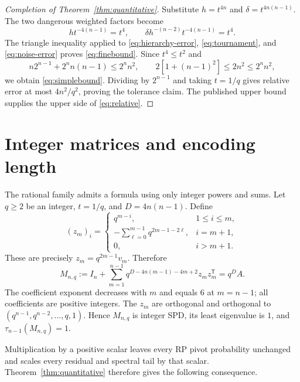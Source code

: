 \documentclass[10pt,letterpaper]{article}
\begin{document}
\begin{proof}[Completion of Theorem~\ref{thm:quantitative}]
Substitute $h=t^{4n}$ and $\delta=t^{4n(n-1)}$. The two dangerous
weighted factors become
\begin{equation}\label{eq:exponents}
 h t^{-4(n-1)}=t^4,\qquad
 \delta h^{-(n-2)}t^{-4(n-1)}=t^4.
\end{equation}
The triangle inequality applied to \eqref{eq:hierarchy-error},
\eqref{eq:tournament}, and \eqref{eq:noise-error} proves
\eqref{eq:finebound}. Since $t^4\leq t^2$ and
\[
 n2^{n-1}+2^n n(n-1)\leq2^n n^2,
 \qquad 2[1+(n-1)^2]\leq2n^2\leq2^n n^2,
\]
we obtain \eqref{eq:simplebound}. Dividing by $2^{n-1}$ and taking
$t=1/q$ gives relative error at most $4n^2/q^2$, proving the tolerance
claim. The published upper bound supplies the upper side of
\eqref{eq:relative}.
\end{proof}

\section{Integer matrices and encoding length}\label{sec:integer}

The rational family admits a formula using only integer powers and sums.
Let $q\geq2$ be an integer, $t=1/q$, and $D=4n(n-1)$. Define
\begin{equation}\label{eq:integer-vectors}
 (z_m)_i=\begin{cases}
 q^{m-i},&1\leq i\leq m,\\
 -\displaystyle\sum_{\ell=0}^{m-1}q^{2m-1-2\ell},&i=m+1,\\
 0,&i>m+1.
 \end{cases}
\end{equation}
These are precisely $z_m=q^{2m-1}v_m$. Therefore
\begin{equation}\label{eq:integer-matrix}
 M_{n,q}:=I_n+\sum_{m=1}^{n-1}
 q^{D-4n(m-1)-4m+2}z_mz_m^{\mathsf T}=q^D A.
\end{equation}
The coefficient exponent decreases with $m$ and equals $6$ at $m=n-1$;
all coefficients are positive integers. The $z_m$ are orthogonal and
orthogonal to $(q^{n-1},q^{n-2},\ldots,q,1)$. Hence $M_{n,q}$ is
integer SPD, its least eigenvalue is $1$, and $\tau_{n-1}(M_{n,q})=1$.

Multiplication by a positive scalar leaves every RP pivot probability
unchanged and scales every residual and spectral tail by that scalar.
Theorem~\ref{thm:quantitative} therefore gives the following consequence.
\end{document}
